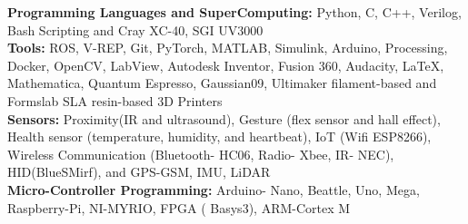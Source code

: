 
\begin{cvparagraph}
\textbf{Programming Languages and SuperComputing:} Python, C, C++, Verilog, Bash Scripting and Cray XC-40, SGI UV3000 \vspace{0.2cm}\\
\textbf{Tools:} ROS, V-REP, Git, PyTorch, MATLAB, Simulink, Arduino, Processing, Docker, OpenCV, LabView, Autodesk Inventor, Fusion 360, Audacity, {\LaTeX}, Mathematica, Quantum Espresso, Gaussian09, Ultimaker filament-based and Formslab SLA resin-based 3D Printers  \vspace{0.2cm}\\
\textbf{Sensors:} Proximity(IR and ultrasound), Gesture (flex sensor and hall effect), Health sensor (temperature, humidity, and heartbeat), IoT  (Wifi ESP8266), Wireless Communication (Bluetooth- HC06, Radio- Xbee, IR-  NEC), HID(BlueSMirf), and GPS-GSM, IMU, LiDAR  \vspace{0.2cm}\\
\textbf{Micro-Controller Programming:} Arduino- Nano, Beattle, Uno, Mega, Raspberry-Pi, NI-MYRIO, FPGA ( Basys3), ARM-Cortex M
\end{cvparagraph}

